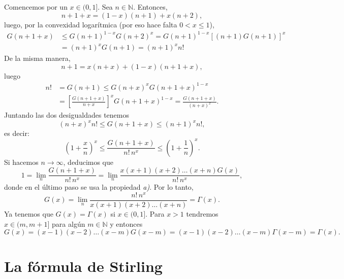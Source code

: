 \documentclass[11pt]{book}
\theoremstyle{plain} %
\theoremstyle{definition} %
\newcommand\N{\mathbb{N}}
\begin{document}
Comencemos por un $x \in (0,1]$. Sea $n \in \N$. Entonces,
\[
   n + 1 + x = (1-x) (n+1) + x (n+2),
\]
luego, por la convexidad logarítmica (por 
eso hace falta $0 < x \leq 1$),
\begin{align*}
   G(n+1+x) &\leq G(n+1)^{1-x} G(n+2)^x
   = G(n+1)^{1-x} \left[ (n+1) G(n+1) \right]^x
   \\
   &= (n+1)^x G(n+1)
   = (n+1)^x n!
\end{align*}
De la misma manera,
\[
   n + 1 = x (n+x) + (1-x)(n+1+x),
\]
luego
\begin{align*}
   n! &= G(n+1) \leq G(n+x)^x G(n+1+x)^{1-x}
   \\
   &= \left[\frac{G(n+1+x)}{n+x} \right]^x G(n+1+x)^{1-x}
   = \frac{G(n+1+x)}{(n+x)^x}.
\end{align*}
Juntando las dos desigualdades tenemos
\[
   (n+x)^x n! \leq G(n+1+x) \leq (n+1)^x n!,
\]
es decir:
\[
   \left( 1 + \frac{x}{n} \right)^x 
   \leq \frac{G(n+1+x)}{n! \, n^x}
   \leq \left( 1 + \frac{1}{n} \right)^x.
\]
Si hacemos $n \to \infty$, deducimos que
\[
   1 = \lim_n \frac{G(n+1+x)}{n! \, n^x}
   = \lim_n \frac{x (x+1) (x+2) \dots (x+n) G(x)}{n! \, n^x},
\]
donde en el último paso se usa la propiedad \emph{a)}. Por lo tanto,
\[
   G(x) = \lim_n \frac{n! \, n^x}{x (x+1) (x+2) \dots (x+n)} = \Gamma(x).
\]
Ya tenemos que $G(x) = \Gamma(x)$ si $x \in (0,1]$. Para $x > 1$ tendremos $x \in 
(m,m+1]$ para algún $m \in \N$ y entonces
\[
   G(x) = (x-1) (x-2) \dots (x-m) G(x-m)
   = (x-1) (x-2) \dots (x-m) \Gamma(x-m)
   = \Gamma(x).
\]

\section{La fórmula de Stirling}
\label{fStirling}
\end{document}
